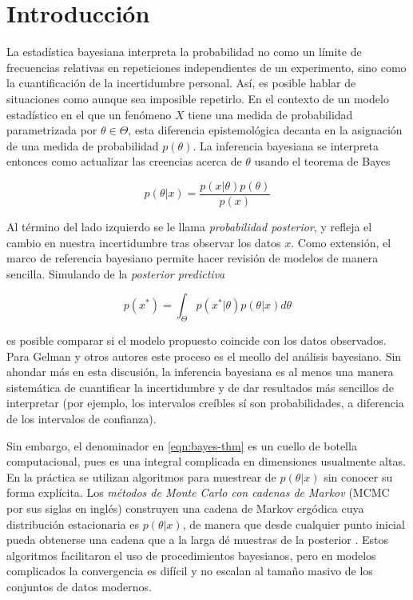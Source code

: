 \documentclass[main.tex]{subfiles}
\begin{document}
\chapter{Introducción}
La estadística bayesiana interpreta la probabilidad no como un límite de frecuencias relativas en repeticiones independientes de un experimento, sino como la cuantificación de la incertidumbre personal. Así, es posible hablar de situaciones como  aunque sea imposible repetirlo. En el contexto de un modelo estadístico en el que un fenómeno $X$ tiene una medida de probabilidad parametrizada por $\theta \in \Theta$, esta diferencia epistemológica decanta en la asignación de una medida de probabilidad $p(\theta)$. La inferencia bayesiana se interpreta entonces como actualizar las creencias acerca de $\theta$ usando el teorema de Bayes

\begin{equation}
	p(\theta | x) = \frac{p(x|\theta)p(\theta)}{p(x)}
	\label{eqn:bayes-thm}	
\end{equation}

Al término del lado izquierdo se le llama \textit{probabilidad posterior}, y refleja el cambio en nuestra incertidumbre tras observar los datos $x$. Como extensión, el marco de referencia bayesiano permite hacer revisión de modelos de manera sencilla. Simulando de la \textit{posterior predictiva} 

\begin{equation*}
	p(x^*) = \int_\Theta p(x^*|\theta)p(\theta | x) d\theta	
\end{equation*}
 
 es posible comparar si el modelo propuesto coincide con los datos observados. Para Gelman y otros autores \cite{gelman-philosphy} este proceso es el meollo del análisis bayesiano. Sin ahondar más en esta discusión, la inferencia bayesiana es al menos una manera sistemática de cuantificar la incertidumbre y de dar resultados más sencillos de interpretar (por ejemplo, los intervalos creíbles sí son probabilidades, a diferencia de los intervalos de confianza).

Sin embargo, el denominador en \eqref{eqn:bayes-thm} es un cuello de botella computacional, pues es una integral complicada en dimensiones usualmente altas. En la práctica se utilizan algoritmos para muestrear de $p(\theta |x)$ sin conocer su forma explícita. Los \textit{métodos de Monte Carlo con cadenas de Markov} (MCMC por sus siglas en inglés) construyen una cadena de Markov ergódica cuya distribución estacionaria es $p(\theta | x)$, de manera que desde cualquier punto inicial pueda obtenerse una cadena que a la larga dé muestras de la posterior \cite{robert-book}. Estos algoritmos facilitaron el uso de procedimientos bayesianos, pero en modelos complicados la convergencia es difícil y no escalan al tamaño masivo de los conjuntos de datos modernos.
\end{document}
